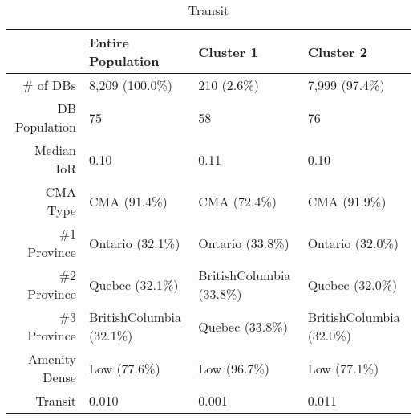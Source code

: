 \documentclass[11pt, a4paper]{article}
\begin{document}
 \pagebreak 
 
\begin{sidewaystable}[ht]
\centering
\begin{tabular}{rlll}
  \hline
 & Entire Population & Cluster 1 & Cluster 2 \\ 
  \hline
\# of DBs & 8,209 (100.0\%) & 210 (2.6\%) & 7,999 (97.4\%) \\ 
  DB Population & 75 & 58 & 76 \\ 
  Median IoR & 0.10 & 0.11 & 0.10 \\ 
  CMA Type & CMA (91.4\%) & CMA (72.4\%) & CMA (91.9\%) \\ 
  \#1 Province & Ontario (32.1\%) & Ontario (33.8\%) & Ontario (32.0\%) \\ 
  \#2 Province & Quebec (32.1\%) & BritishColumbia (33.8\%) & Quebec (32.0\%) \\ 
  \#3 Province & BritishColumbia (32.1\%) & Quebec (33.8\%) & BritishColumbia (32.0\%) \\ 
  Amenity Dense & Low (77.6\%) & Low (96.7\%) & Low (77.1\%) \\ 
  Transit & 0.010 & 0.001 & 0.011 \\ 
   \hline
\end{tabular}
\caption{Transit} 
\end{sidewaystable}





 \pagebreak 
 

 
\end{document}
